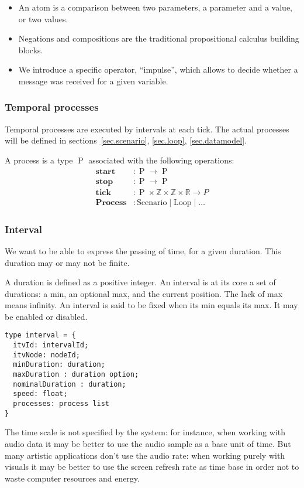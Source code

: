 \documentclass[applsci,article,submit,moreauthors,pdftex,10pt,a4paper]{mdpi}
\DeclareMathOperator{\proc}{P}
\begin{document}
\begin{itemize}
    \item An atom is a comparison between two parameters, a parameter and a value, or two values.
    \item Negations and compositions are the traditional propositional calculus building blocks.
    \item We introduce a specific operator, ``impulse'', which allows to decide whether a message was received for a given variable.
\end{itemize}

\subsubsection{Temporal processes}
Temporal processes are executed by intervals at each tick. 
The actual processes will be defined in sections~\ref{sec.scenario}, \ref{sec.loop}, \ref{sec.datamodel}.

A process is a type $\proc$ associated with the following operations: 
\begin{align*}\label{proc.funs}
\mathbf{start}&: \proc \rightarrow \proc \\
\mathbf{stop}&: \proc \rightarrow \proc \\
\mathbf{tick}&: \proc \times \mathbb{Z} \times \mathbb{Z} \times \mathbb{R} \rightarrow P\\
\mathbf{Process}&: \mathrm{Scenario} \mid \mathrm{Loop} \mid \dots
\end{align*}
\subsubsection{Interval}
We want to be able to express the passing of time, for a given duration.
This duration may or may not be finite.

A duration is defined as a positive integer.
An interval is at its core a set of durations: a min, an optional max, and the current position. 
The lack of max means infinity.
An interval is said to be fixed when its min equals its max. It may be enabled or disabled.

\begin{lstlisting}
type interval = {
  itvId: intervalId;
  itvNode: nodeId;
  minDuration: duration;
  maxDuration : duration option;
  nominalDuration : duration;
  speed: float;
  processes: process list
}
\end{lstlisting}

The time scale is not specified by the system: for instance, when working with audio data it may be better to use the audio sample as a base unit of time.
But many artistic applications don't use the audio rate: when working purely with visuals it may be better to use the screen refresh rate as time base in order not to 
waste computer resources and energy. 
\end{document}
